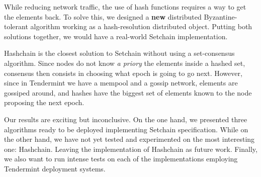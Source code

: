 While reducing network traffic, the use of hash functions requires a way to get
the elements back.
%
To solve this, we designed a \textbf{new} distributed Byzantine-tolerant
algorithm working as a hash-resolution distributed object.
%
Putting both solutions together, we would have a real-world Setchain
implementation.

Hashchain is the closest solution to Setchain without using a set-consensus
algorithm.
%
Since nodes do not know \emph{a priory} the elements inside a hashed set,
consensus then consists in choosing what epoch is going to go next.
%
However, since in Tendermint we have a mempool and a gossip network, elements
are gossiped around, and hashes have the biggest set of elements known to the
node proposing the next epoch.

Our results are exciting but inconclusive.
%
On the one hand, we presented three algorithms ready to be deployed implementing
Setchain specification.
%
While on the other hand, we have not yet tested and experimented on the most
interesting one: Hashchain.
%
Leaving the implementation of Hashchain as future work.
%
Finally, we also want to run intense tests on each of the implementations
employing Tendermint deployment systems.

